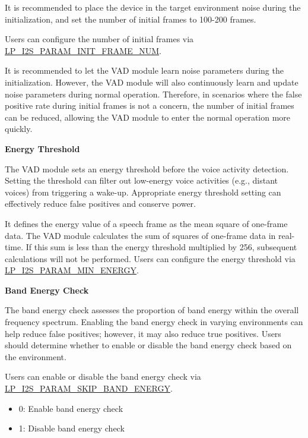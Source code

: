 \documentclass[main\_\_EN.tex]{subfiles}
\begin{document}
It is recommended to place the device in the target environment noise during the initialization, and set the number of initial frames to 100-200 frames.

Users can configure the number of initial frames via \hyperref[fielddesc:LPI2SPARAMINITFRAMENUM]{LP\_I2S\_PARAM\_INIT\_FRAME\_NUM}.

\begin{tiplisting}
It is recommended to let the VAD module learn noise parameters during the initialization. However, the VAD module will also continuously learn and update noise parameters during normal operation. Therefore, in scenarios where the false positive rate during initial frames is not a concern, the number of initial frames can be reduced, allowing the VAD module to enter the normal operation more quickly.
\end{tiplisting}


\textbf{Energy Threshold}

The VAD module sets an energy threshold before the voice activity detection. Setting the threshold can filter out low-energy voice activities (e.g., distant voices) from triggering a wake-up. Appropriate energy threshold setting can effectively reduce false positives and conserve power.

It defines the energy value of a speech frame as the mean square of one-frame data. The VAD module calculates the sum of squares of one-frame data in real-time. If this sum is less than the energy threshold multiplied by 256, subsequent calculations will not be performed. Users can configure the energy threshold via \hyperref[fielddesc:LPI2SPARAMMINENERGY]{LP\_I2S\_PARAM\_MIN\_ENERGY}.


\textbf{Band Energy Check}

The band energy check assesses the proportion of band energy within the overall frequency spectrum. Enabling the band energy check in varying environments can help reduce false positives; however, it may also reduce true positives. Users should determine whether to enable or disable the band energy check based on the environment.

Users can enable or disable the band energy check via \hyperref[fielddesc:LPI2SPARAMSKIPBANDENERGY]{LP\_I2S\_PARAM\_SKIP\_BAND\_ENERGY}.

\begin{itemize}
    \item 0: Enable band energy check
    \item 1: Disable band energy check
\end{itemize}
\end{document}
